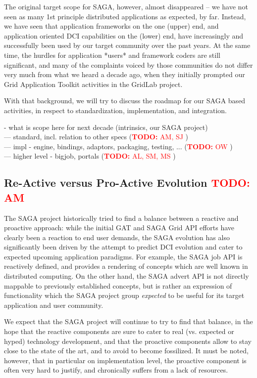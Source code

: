 \documentclass{article}
\newcommand{\I}[1]{\textit{#1}}
\newcommand{\B}[1]{\textbf{#1}}
\newcommand{\nind}{\noindent}
\newcommand{\todo}[1]{{\textcolor{red}{\B{TODO:} #1 }}}
\begin{document}
 The original target scope for SAGA, however, almost disappeared -- we
 have not seen as many 1st principle distributed applications as
 expected, by far.  Instead, we have seen that application frameworks
 on the one (upper) end, and application oriented DCI capabilities on
 the (lower) end, have increasingly and successfully been used by our
 target community over the past years.  At the same time, the hurdles
 for application *users* and framework coders are still significant,
 and many of the complaints voiced by those communities do not differ
 very much from what we heard a decade ago, when they initially
 prompted our Grid Application Toolkit activities in the GridLab
 project.

 With that background, we will try to discuss the roadmap for our SAGA
 based activities, in respect to standardization, implementation, and
 integration.

  \nind
  - what is scope here for next decade (intrinsics, our SAGA project)\\
  --- standard, incl. relation to other specs (\todo{AM, SJ} )\\
  --- impl - engine, bindings, adaptors, packaging, testing, ... (\todo{OW})\\
  --- higher level - bigjob, portals (\todo{AL, SM, MS})\\
      

 \subsection{Re-Active versus Pro-Active Evolution \todo{AM}}

  The SAGA project historically tried to find a balance between a
  reactive and proactive approach: while the initial GAT and SAGA Grid
  API efforts have clearly been a reaction to end user demands, the
  SAGA evolution has also significantly been driven by the attempt to
  predict DCI evolution and cater to expected upcoming application
  paradigms.  For example, the SAGA job API is reactively defined, and
  provides a rendering of concepts which are well known in distributed
  computing.  On the other hand, the SAGA advert API is not directly
  mappable to previously established concepts, but is rather an
  expression of functionality which the SAGA project group
  \I{expected} to be useful for its target application and user
  community.

  We expect that the SAGA project will continue to try to find that
  balance, in the hope that the reactive components are sure to cater
  to real (vs. expected or hyped) technology development, and that the
  proactive components allow to stay close to the state of the art,
  and to avoid to become fossilized.  It must be noted, however, that
  in particular on implementation level, the proactive component is
  often very hard to justify, and chronically suffers from a lack of
  resources.
\end{document}
